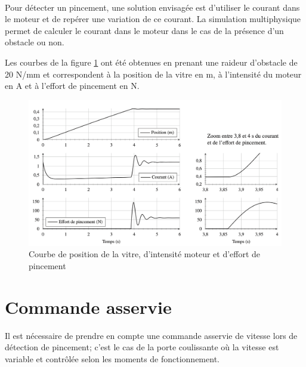 
~\

Pour détecter un pincement, une solution envisagée est d'utiliser le courant dans le moteur et de repérer une variation de ce courant. La simulation multiphysique permet de calculer le courant dans le moteur dans le cas de la présence d'un obstacle ou non.

Les courbes de la figure \ref{img12} ont été obtenues en prenant une raideur d'obstacle de 20 N/mm et correspondent à la position de la vitre en m, à l'intensité du moteur en A et à l'effort de pincement en N. 

\begin{figure}[!h]
\centering\includegraphics[width=0.8\linewidth]{img/figure12}
 \caption{Courbe de position de la vitre, d'intensité moteur et d'effort de pincement}
 \label{img12}
\end{figure}


\section{Commande asservie}

Il est nécessaire de prendre en compte une commande asservie de vitesse lors de détection de  pincement; c'est le cas de la porte coulissante où la vitesse est variable et contrôlée selon les moments de fonctionnement. 

